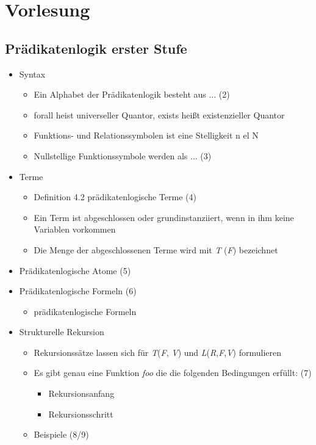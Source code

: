 
\chapter{Vorlesung}
\section{Prädikatenlogik erster Stufe}

\begin{itemize}
\item Syntax
\begin{itemize}
	\item Ein Alphabet der Prädikatenlogik besteht aus ... (2)
	\item forall heist universeller Quantor, exists heißt							existenzieller Quantor
	\item Funktions- und Relationssymbolen ist eine Stelligkeit n el N			\item Nullstellige Funktionssymbole werden als ... (3)
\end{itemize}
\item Terme
\begin{itemize}
	\item Definition 4.2 prädikatenlogische Terme (4)
	\item Ein Term ist abgeschlossen oder grundinstanziiert, wenn in ihm 			keine Variablen vorkommen
	\item Die Menge der abgeschlossenen Terme wird mit \textit{T}						(\textit{F}) bezeichnet
\end{itemize}
\item Prädikatenlogische Atome (5)
\item Prädikatenlogische Formeln (6)
\begin{itemize}
	\item prädikatenlogische Formeln
\end{itemize}
\item Strukturelle Rekursion 
\begin{itemize}
	\item Rekursionssätze lassen sich für \textit{T}(\textit{F},					\textit{V}) und \textit{L}(\textit{R},\textit{F},\textit{V}) 				formulieren 
	\item Es gibt genau eine Funktion \textit{foo} die die folgenden Bedingungen 				erfüllt: (7)
	\begin{itemize}
		\item Rekursionsanfang
		\item Rekursionsschritt
	\end{itemize}
	\item Beispiele (8/9)
\end{itemize}
\end{itemize}

